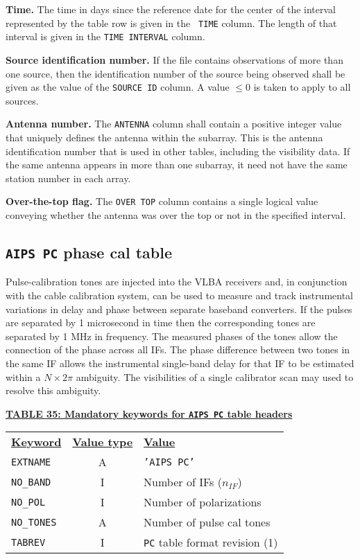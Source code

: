 \documentclass[twoside]{article}
\newcommand{\nif}{$n_{IF}$}
\begin{document}
{\bf Time.} The time in days since the reference date for the center
of the interval represented by the table row is given in the {\tt
  TIME} column.  The length of that interval is given in the {\tt TIME
  INTERVAL} column.

{\bf Source identification number.} If the file contains observations
of more than one source, then the identification number of the source
being observed shall be given as the value of the {\tt SOURCE ID}
column.  A value $\leq 0$ is taken to apply to all sources.

{\bf Antenna number.} The {\tt ANTENNA} column shall contain a
positive integer value that uniquely defines the antenna within the
subarray.  This is the antenna identification number that is used in
other tables, including the visibility data. If the same antenna
appears in more than one subarray, it need not have the same station
number in each array.

{\bf Over-the-top flag.} The {\tt OVER TOP} column contains a single
logical value conveying whether the antenna was over the top or not in
the specified interval.

\subsection{{\tt AIPS PC} phase cal table}
\label{s:PC}

Pulse-calibration tones are injected into the VLBA receivers and, in
conjunction with the cable calibration system, can be used to measure
and track instrumental variations in delay and phase between separate
baseband converters. If the pulses are separated by 1 microsecond in
time then the corresponding tones are separated by 1 MHz in frequency.
The measured phases of the tones allow the connection of the phase
across all IFs. The phase difference between two tones in the same
IF allows the instrumental single-band delay for that IF to be
estimated within a $N \times 2 \pi$ ambiguity.  The visibilities of a
single calibrator scan may used to resolve this ambiguity.

\begin{center}
\underline{\bf{TABLE 35: Mandatory keywords for {\tt AIPS PC} table
    headers}}\\
\begin{tabular}{lcl}
\noalign{\vspace{2pt}} \label{ta:PCkeys}
\underline{{\bf Keyword}} & \underline{\bf{Value type}} &
    \underline{\bf{Value\vphantom{y}}} \\
\noalign{\vspace{2pt}}
{\tt EXTNAME}   & A & {\tt 'AIPS PC'}  \\
{\tt NO\_BAND}  & I & Number of IFs (\nif)\\
{\tt NO\_POL}   & I & Number of polarizations \\
{\tt NO\_TONES} & A & Number of pulse cal tones \\
{\tt TABREV}    & I & {\tt PC} table format revision (1)
\end{tabular}
\end{center}
\end{document}
